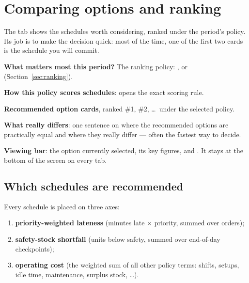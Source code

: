 \chapter{Comparing options and ranking}\label{ch:options}

The  tab shows the schedules worth considering, ranked under the period's policy. Its job is to
make the decision quick: most of the time, one of the first two cards is the schedule you will commit.


\begin{callouts}
  \item[1] \textbf{What matters most this period?} The ranking policy: ,  or
            (Section~\ref{sec:ranking}).
  \item[2] \textbf{How this policy scores schedules}: opens the exact scoring rule.
  \item[3] \textbf{Recommended option cards}, ranked \#1, \#2, \dots\ under the selected policy.
  \item[4] \textbf{What really differs}: one sentence on where the recommended options are practically equal
           and where they really differ --- often the fastest way to decide.
  \item[5] \textbf{Viewing bar}: the option currently selected, its key figures, and . It
           stays at the bottom of the screen on every tab.
\end{callouts}

\section{Which schedules are recommended}\label{sec:recommended}

Every schedule is placed on three axes:

\begin{enumerate}
  \item \textbf{priority-weighted lateness} (minutes late $\times$ priority, summed over orders);
  \item \textbf{safety-stock shortfall} (units below safety, summed over end-of-day checkpoints);
  \item \textbf{operating cost} (the weighted sum of all other policy terms: shifts, setups, idle time,
        maintenance, surplus stock, \dots).
\end{enumerate}

